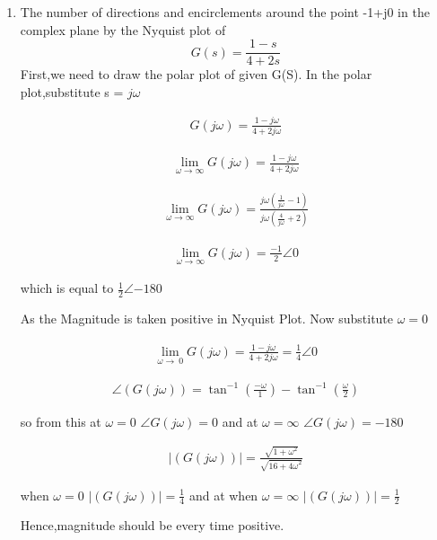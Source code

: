 \begin{enumerate}[label=\thesection.\arabic*.,ref=\thesection.\theenumi]
\item The number of directions and encirclements around the point -1+j0 in the complex plane by the Nyquist plot of $$G(s) = \frac{1-s}{4+2s}$$
\bigskip
\solution
First,we need to draw the polar plot of given G(S).
In the polar plot,substitute s = $j\omega$

\begin{align}
G(j\omega) = \frac{1-j\omega}{4+2j\omega} 
\end{align}

\begin{align}
\lim_{\omega\to\infty} G(j\omega) = \frac{1-j\omega}{4+2j\omega} 
\end{align}

\begin{align}
\lim_{\omega\to\infty} G(j\omega) = \frac{j\omega(\frac{1}{j\omega}-1)}{j\omega(\frac{4}{j\omega}+2)}  
\end{align}

\begin{align}
\lim_{\omega\to\infty} G(j\omega) = \frac{-1}{2}\angle 0  
\end{align}

which is equal to $\frac{1}{2}\angle{-180}$

As the Magnitude is taken positive in Nyquist Plot.
Now substitute $\omega = 0$

\begin{align}
\lim_{\omega\to\ 0} G(j\omega) = \frac{1-j\omega}{4+2j\omega} = \frac{1}{4}\angle 0 
\end{align}

\begin{align}
\angle (G(j\omega)) = \tan^{-1}(\frac{-\omega}{1}) - \tan^{-1}(\frac{\omega}{2})
\end{align}

so from this  at $\omega = 0$ $\angle G(j\omega) = 0$ and at $\omega = \infty$ $\angle G(j\omega)  =-180$     


\begin{align}
\mid(G(j\omega))\mid = \frac{\sqrt{1+{\omega}^2}}{\sqrt{16+{4\omega}^2}} 
\end{align}

when $\omega = 0$ $\mid(G(j\omega))\mid = \frac{1}{4}$ and at when $\omega = \infty$ $\mid(G(j\omega))\mid = \frac{1}{2}$

Hence,magnitude should be every time positive.



\end{enumerate}
